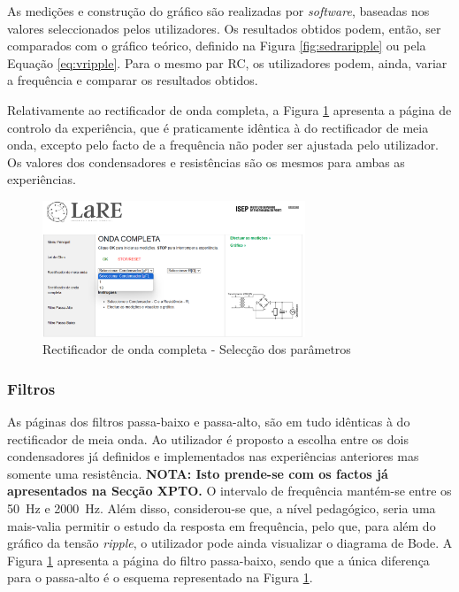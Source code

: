 As medições e construção do gráfico são realizadas por \textit{software}, baseadas nos valores seleccionados pelos utilizadores. Os resultados obtidos podem, então, ser comparados com o gráfico teórico, definido na Figura \ref{fig:sedraripple} ou pela Equação \ref{eq:vripple}. Para o mesmo par RC, os utilizadores podem, ainda, variar a frequência e comparar os resultados obtidos.

Relativamente ao rectificador de onda completa, a Figura \ref{fig:ondacompletamenuCTRL} apresenta a página de controlo da experiência, que é praticamente idêntica à do rectificador de meia onda, excepto pelo facto de a frequência não poder ser ajustada pelo utilizador. Os valores dos condensadores e resistências são os mesmos para ambas as experiências.

\begin{figure}[hbtp]
	\centering
	\includegraphics[width=0.7\textwidth]{figures/ondacompleta_control.png}
	\caption{Rectificador de onda completa - Selecção dos parâmetros}
	\label{fig:ondacompletamenuCTRL}
\end{figure}

\subsubsection{Filtros}
\label{sec:filtrosSW}
As páginas dos filtros passa-baixo e passa-alto, são em tudo idênticas à do rectificador de meia onda. Ao utilizador é proposto a escolha entre os dois condensadores já definidos e implementados nas experiências anteriores mas somente uma resistência. \textbf{NOTA:  Isto prende-se com os factos já apresentados na Secção XPTO.} O intervalo de frequência mantém-se entre os \SI{50}{\hertz} e \SI{2000}{\hertz}. Além disso, considerou-se que, a nível pedagógico, seria uma mais-valia permitir o estudo da resposta em frequência, pelo que, para além do gráfico da tensão \textit{ripple}, o utilizador pode ainda visualizar o diagrama de Bode. A Figura \ref{fig:ondacompletamenuCTRL} apresenta a página do filtro passa-baixo, sendo que a única diferença para o passa-alto é o esquema representado na Figura \ref{fig:ondacompletamenuCTRL}.

